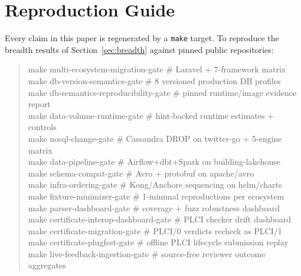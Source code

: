 \documentclass[11pt]{article}
\newcommand{\code}[1]{\texttt{#1}}
\begin{document}
\section{Reproduction Guide}
\label{app:repro}

Every claim in this paper is regenerated by a \code{make} target. To reproduce the breadth results of
Section~\ref{sec:breadth} against pinned public repositories:

\begin{quote}\small\ttfamily
make multi-ecosystem-migration-gate \quad\# Laravel + 7-framework matrix\\
make db-version-semantics-gate \quad\# 8 versioned production DB profiles\\
make db-semantics-reproducibility-gate \quad\# pinned runtime/image evidence report\\
make data-volume-runtime-gate \quad\# hint-backed runtime estimates + controls\\
make nosql-change-gate \hspace{3.05em}\# Cassandra DROP on twitter-go + 5-engine matrix\\
make data-pipeline-gate \hspace{2.4em}\# Airflow+dbt+Spark on building-lakehouse\\
make schema-compat-gate \hspace{2.4em}\# Avro + protobuf on apache/avro\\
make infra-ordering-gate \hspace{2.0em}\# Kong/Anchore sequencing on helm/charts\\
make fixture-minimizer-gate \hspace{0.7em}\# 1-minimal reproductions per ecosystem\\
make parser-dashboard-gate \hspace{1.1em}\# coverage + fuzz robustness dashboard\\
make certificate-interop-dashboard-gate \quad\# PLCI checker drift dashboard\\
make certificate-migration-gate \hspace{0.1em}\# PLCI/0 verdicts recheck as PLCI/1\\
make certificate-plugfest-gate \hspace{0.25em}\# offline PLCI lifecycle submission replay\\
make live-feedback-ingestion-gate \hspace{0.15em}\# source-free reviewer outcome aggregates\\

\end{quote}
\end{document}
